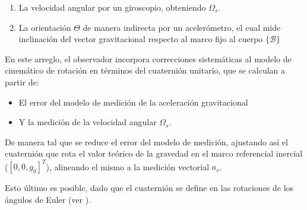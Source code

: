 \documentclass[conference]{IEEEtran}
\newcommand{\marco}[1]{\{\mathcal{#1}\}}
\begin{document}
\begin{enumerate} 
\item La velocidad angular por un giroscopio, obteniendo $\Omega_s$.
\item La orientación $\Theta$ de manera indirecta por un acelerómetro, el cual mide inclinación del vector gravitacional respecto al marco fijo al cuerpo $\marco{B}$
\end{enumerate}
En este arreglo, el observador incorpora correcciones sistemáticas al modelo de cinemático de rotación en términos del cuaternión unitario, que se calculan a partir de:
\begin{itemize}
\item El error del modelo de medición de la aceleración gravitacional 
\item Y la medición de la velocidad angular $\Omega_s$.
\end{itemize}
De manera tal que se reduce el error del modelo de medición, ajustando así el cuaternión que rota el valor teórico de la gravedad en el marco referencial inercial ($[0,0,g_0]^T$), alineando el mismo a la medición vectorial $a_s$.\par
Esto último es posible, dado que el cuaternión se define en las rotaciones de los ángulos de Euler (ver \cite{Altmann1986}).\par
\end{document}
